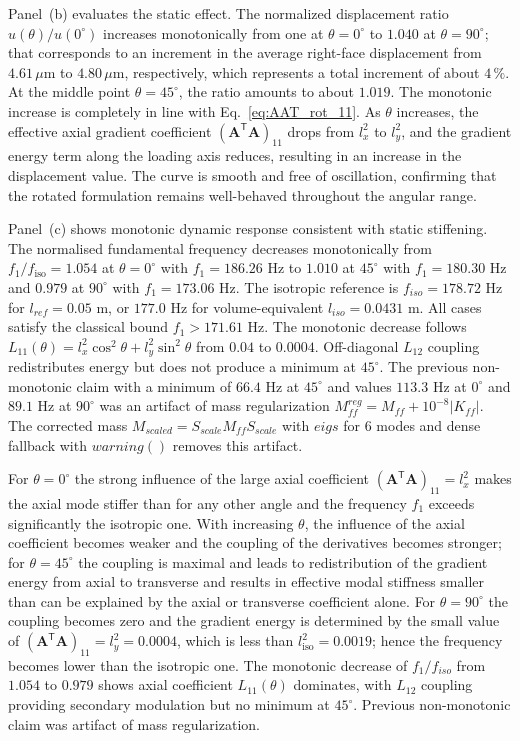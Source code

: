 \documentclass[final,3p,times,fleqn]{elsarticle}
\begin{document}
Panel~(b) evaluates the static effect.
The normalized displacement ratio $u(\theta)/u(0^{\circ})$ increases
monotonically from one at $\theta = 0^{\circ}$ to $1.040$ at
$\theta = 90^{\circ}$; that corresponds to an increment in the average
right-face displacement from $4.61\,\mu$m to $4.80\,\mu$m,
respectively, which represents a total increment of about $4\,\%$.
At the middle point $\theta = 45^{\circ}$, the ratio amounts to about $1.019$.
The monotonic increase is completely in line with
Eq.~\eqref{eq:AAT_rot_11}. As $\theta$ increases, the effective axial gradient coefficient $(\mathbf{A}^{\mathsf{T}}\mathbf{A})_{11}$
drops from $l_{x}^{2}$ to $l_{y}^{2}$, and the gradient energy term along the loading axis reduces, resulting in an increase in the displacement value.
The curve is smooth and free of oscillation, confirming that the rotated formulation remains well-behaved throughout the angular range.

Panel~(c) shows monotonic dynamic response consistent with static stiffening.
The normalised fundamental frequency decreases monotonically from $f_{1}/f_{\mathrm{iso}}=1.054$ at $\theta=0^{\circ}$ with $f_1=186.26$ Hz to $1.010$ at $45^{\circ}$ with $f_1=180.30$ Hz and $0.979$ at $90^{\circ}$ with $f_1=173.06$ Hz. The isotropic reference is $f_{iso}=178.72$ Hz for $l_{ref}=0.05$ m, or $177.0$ Hz for volume-equivalent $l_{iso}=0.0431$ m. All cases satisfy the classical bound $f_1>171.61$ Hz. The monotonic decrease follows $L_{11}(\theta)=l_x^2\cos^2\theta+l_y^2\sin^2\theta$ from $0.04$ to $0.0004$. Off-diagonal $L_{12}$ coupling redistributes energy but does not produce a minimum at $45^{\circ}$. The previous non-monotonic claim with a minimum of $66.4$ Hz at $45^{\circ}$ and values $113.3$ Hz at $0^{\circ}$ and $89.1$ Hz at $90^{\circ}$ was an artifact of mass regularization $M_{ff}^{reg}=M_{ff}+10^{-8}|K_{ff}|$. The corrected mass $M_{scaled}=S_{scale}M_{ff}S_{scale}$ with $eigs$ for 6 modes and dense fallback with $warning()$ removes this artifact.

For $\theta = 0^{\circ}$ the strong influence of the large axial coefficient
$(\mathbf{A}^{\mathsf{T}}\mathbf{A})_{11} = l_{x}^{2}$ makes the axial
mode stiffer than for any other angle and the frequency $f_{1}$ exceeds
significantly the isotropic one.
With increasing $\theta$, the influence of the axial coefficient becomes weaker and the
coupling of the derivatives becomes stronger; for $\theta = 45^{\circ}$ the coupling is maximal and
leads to redistribution of the gradient energy from axial to transverse and results in effective
modal stiffness smaller than can be explained by the axial or transverse coefficient alone.
For $\theta = 90^{\circ}$ the coupling becomes zero and the gradient energy is determined
by the small value of $(\mathbf{A}^{\mathsf{T}}\mathbf{A})_{11} = l_{y}^{2} = 0.0004$,
which is less than $l_{\mathrm{iso}}^{2} = 0.0019$; hence the frequency becomes lower than
the isotropic one.
The monotonic decrease of $f_1/f_{iso}$ from $1.054$ to $0.979$ shows axial coefficient $L_{11}(\theta)$ dominates, with $L_{12}$ coupling providing secondary modulation but no minimum at $45^{\circ}$. Previous non-monotonic claim was artifact of mass regularization.
\end{document}
